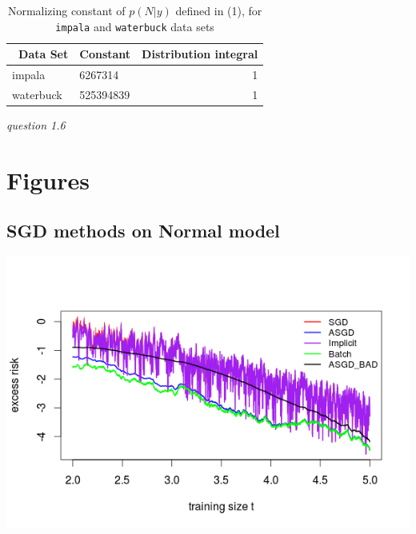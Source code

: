 \documentclass[twoside]{article}
\begin{document}
\begin{table}[H]
\caption{Normalizing constant of $p(N|y)$ defined in (1), for \texttt{impala} and \texttt{waterbuck} data sets}
\centering
\begin{tabular}{llr}
\toprule\
Data Set & Constant & Distribution integral \\
\midrule
impala & 6267314 & 1 \\
waterbuck & 525394839 & 1\\
\bottomrule
\end{tabular}
\end{table}

\textit{question 1.6}


\appendix
\section{Figures}

\subsection{SGD methods on Normal model}

\begingroup
\centering
\includegraphics[scale=0.55]{./img/2a_updates.png}
\endgroup
\end{document}
